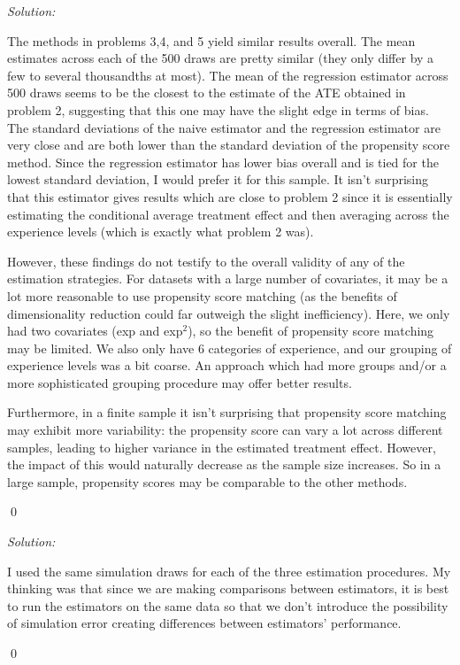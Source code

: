 \documentclass[12pt]{article}
\newenvironment{problem}[2][Problem]{\begin{trivlist}
\item[\hskip \labelsep {\bfseries #1}\hskip \labelsep {\bfseries #2.}]}{\end{trivlist}}
\newenvironment{sol}
    {\emph{Solution:}
    }
    {
    \qed
    }
\begin{document}
\begin{problem}{6}
\end{problem}
\begin{sol}
The methods in problems 3,4, and 5 yield similar results overall. The mean estimates across each of the 500 draws are pretty similar (they only differ by a few to several thousandths at most). The mean of the regression estimator across 500 draws seems to be the closest to the estimate of the ATE obtained in problem 2, suggesting that this one may have the slight edge in terms of bias. The standard deviations of the naive estimator and the regression estimator are very close and are both lower than the standard deviation of the propensity score method. Since the regression estimator has lower bias overall and is tied for the lowest standard deviation, I would prefer it for this sample. It isn't surprising that this estimator gives results which are close to problem 2 since it is essentially estimating the conditional average treatment effect and then averaging across the experience levels (which is exactly what problem 2 was). 

However, these findings do not testify to the overall validity of any of the estimation strategies. For datasets with a large number of covariates, it may be a lot more reasonable to use propensity score matching (as the benefits of dimensionality reduction could far outweigh the slight inefficiency). Here, we only had two covariates (exp and exp$^2$), so the benefit of propensity score matching may be limited. We also only have 6 categories of experience, and our grouping of experience levels was a bit coarse. An approach which had more groups and/or a more sophisticated grouping procedure may offer better results.

Furthermore, in a finite sample it isn't surprising that propensity score matching may exhibit more variability: the propensity score can vary a lot across different samples, leading to higher variance in the estimated treatment effect. However, the impact of this would naturally decrease as the sample size increases. So in a large sample, propensity scores may be comparable to the other methods.
\end{sol}

\begin{problem}{7}
\end{problem}
\begin{sol}
    I used the same simulation draws for each of the three estimation procedures. My thinking was that since we are making comparisons between estimators, it is best to run the estimators on the same data so that we don't introduce the possibility of simulation error creating differences between estimators' performance. 
\end{sol}
\end{document}
